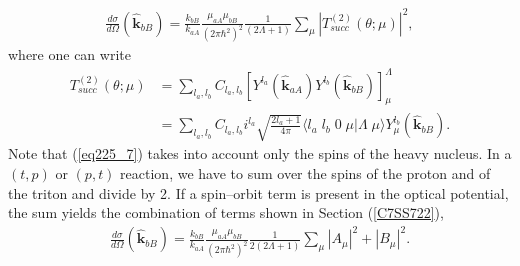 \begin{equation}\label{eq225_7}
\begin{split}
\frac{d\sigma}{d\Omega}(\hat{\mathbf{k}}_{bB})=\frac{k_{bB}}{k_{aA}}\frac{\mu_{aA}\mu_{bB}}{(2\pi\hbar^2)^2}
\frac{1}{(2\Lambda+1)}\sum_{\mu}|T_{succ}^{(2)}(\theta;\mu)|^2,
\end{split}
\end{equation}
where one can write
\begin{equation}\label{eq226}
 \begin{split}
T_{succ}^{(2)}(\theta;\mu) &=\sum_{l_a,l_b} C_{l_a,l_b} \left[ Y ^{l_a} (\hat{\mathbf{k}}_{aA}) Y ^{l_{b}} (\hat{\mathbf{k}}_{bB}) \right]^{\Lambda}_\mu\\
&=\sum_{l_a,l_b} C_{l_a,l_b}i^{l_a} \sqrt{\frac{2l_a+1}{4\pi}}\langle l_a \;l_b\;0\;\mu|\Lambda\;\mu\rangle Y ^{l_{b}}_\mu (\hat{\mathbf{k}}_{bB}).
 \end{split}
\end{equation}
Note that (\ref{eq225_7}) takes into account only the spins of the heavy nucleus. In a $(t,p)$ or $(p,t)$ reaction, we have to sum over the spins of the proton and of the triton and divide by 2. If a spin--orbit term is present in the optical potential, the sum yields the combination of terms shown in Section (\ref{C7SS722}),
\begin{equation}\label{eq225_8}
\begin{split}
\frac{d\sigma}{d\Omega}(\hat{\mathbf{k}}_{bB})=\frac{k_{bB}}{k_{aA}}\frac{\mu_{aA}\mu_{bB}}{(2\pi\hbar^2)^2}
\frac{1}{2(2\Lambda+1)}\sum_{\mu}|A_{\mu}|^2+|B_{\mu}|^2.
\end{split}
\end{equation}
